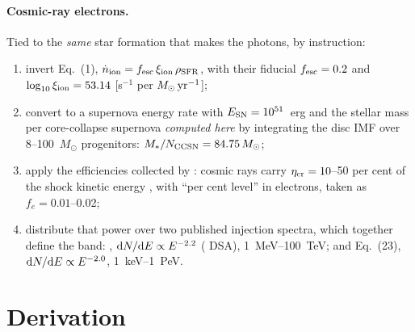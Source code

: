 \documentclass[11pt,a4paper]{article}
\begin{document}
\paragraph{Cosmic-ray electrons.}
Tied to the \emph{same} star formation that makes the photons, by instruction:
\begin{enumerate}\itemsep2pt
  \item invert \citet{Robertson2015} Eq.~(1),
  $\dot n_{\rm ion} = f_{\rm esc}\,\xi_{\rm ion}\,\rho_{\rm SFR}$, with their
  fiducial $f_{\rm esc}=0.2$ and $\log_{10}\xi_{\rm ion} = 53.14$
  [s$^{-1}$ per $M_\odot\,{\rm yr^{-1}}$];
  \item convert to a supernova energy rate with $E_{\rm SN}=10^{51}$~erg
  \citep{WoosleyWeaver1995} and the stellar mass per core-collapse supernova
  \emph{computed here} by integrating the \citet{Chabrier2003} disc IMF over
  8--100~$M_\odot$ progenitors:
  $M_\ast/N_{\rm CCSN} = 84.75\,M_\odot$;
  \item apply the efficiencies collected by \citet{GesseyJones2023}:
  cosmic rays carry $\eta_{\rm cr}=10$--50 per cent of the shock kinetic
  energy \citep{Drury1989,Berezinskii1990,CaprioliSpitkovsky2014}, with
  ``per cent level'' in electrons, taken as $f_e = 0.01$--0.02;
  \item distribute that power over two published injection spectra, which
  together define the band:
  \citet{Tueros2014}, ${\rm d}N/{\rm d}E\propto E^{-2.2}$
  (\citealt{Drury1983} DSA), 1~MeV--100~TeV; and
  \citet{GesseyJones2023} Eq.~(23), ${\rm d}N/{\rm d}E\propto E^{-2.0}$,
  1~keV--1~PeV.
\end{enumerate}

\section{Derivation}
\end{document}
